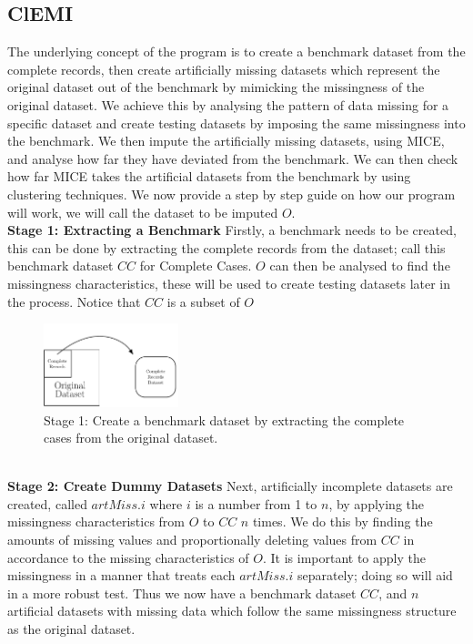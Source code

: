 \documentclass[conference,compsoc]{IEEEtran}
\begin{document}
	\subsection{ClEMI} %
	\label{sub:clemi}
	
	The underlying concept of the program is to create a benchmark dataset from the complete records, then create artificially missing datasets which represent the original dataset out of the benchmark by mimicking the missingness of the original dataset. We achieve this by analysing the pattern of data missing for a specific dataset and create testing datasets by imposing the same missingness into the benchmark. We then impute the artificially missing datasets, using MICE, and analyse how far they have deviated from the benchmark. We can then check how far MICE takes the artificial datasets from the benchmark by using clustering techniques. We now provide a step by step guide on how our program will work, we will call the dataset to be imputed $O$.
	\\
	\indent \textbf{Stage 1: Extracting a Benchmark}
	Firstly, a benchmark needs to be created, this can be done by extracting the complete records from the dataset; call this benchmark dataset $CC$ for Complete Cases. $O$ can then be analysed to find the missingness characteristics, these will be used to create testing datasets later in the process. Notice that $CC$ is a subset of $O$ 
	\begin{figure}[!ht]	
		\caption{Stage 1: Create a benchmark dataset by extracting the complete cases from the original dataset.}
		\centering
		\includegraphics[width=0.35\textwidth]{stage1.pdf}
	\end{figure}
	\\
	\indent \textbf{Stage 2: Create Dummy Datasets}
	Next, artificially incomplete datasets are created, called $artMiss.i$ where $i$ is a number from 1 to $n$, by applying the missingness characteristics from $O$ to $CC$ $n$ times. We do this by finding the amounts of missing values and proportionally deleting values from $CC$ in accordance to the missing characteristics of $O$. It is important to apply the missingness in a manner that treats each $artMiss.i$ separately; doing so will aid in a more robust test. Thus we now have a benchmark dataset $CC$, and $n$ artificial datasets with missing data which follow the same missingness structure as the original dataset.
\end{document}
